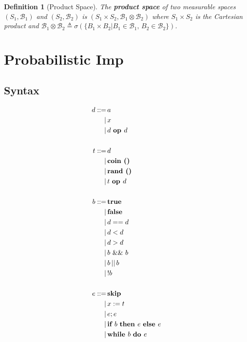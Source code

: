 \documentclass{article}
\newtheorem*{definition}{Definition}
\begin{document}
	\begin{definition}[Product Space]
		The {\bf product space} of two measurable spaces $(S_1, \mathcal{B}_1)$ and $(S_2, \mathcal{B}_2)$ is $(S_1 \times S_2, \mathcal{B}_1 \otimes \mathcal{B}_2)$
		where $S_1 \times S_2$ is the Cartesian product and
		$\mathcal{B}_1 \otimes \mathcal{B}_2 \triangleq \sigma(\{ B_1 \times B_2 | B_1 \in \mathcal{B}_1,\, B_2 \in \mathcal{B}_2\})$.
		
	\end{definition}
	
\section{Probabilistic Imp}
	\subsection{Syntax}
	\begin{equation*}
		\begin{split}
			d ::
			=\,& a \\ 
			|\,& x \\
			|\,& d \text{ \bf op } d \\
			\,\\
			t ::
			=\,& d \\
			|\,& \text{\bf coin () } \\
			|\,& \text{\bf rand () } \\
			|\,& t \text{ \bf op } d \\
			\,\\
			b ::
			=\,& \text{\bf true} \\
			|\,& \text{\bf false} \\
			|\,& d == d \\
			|\,& d < d \\
			|\,& d > d \\
			|\,& b \text{ \&\& } b \\
			|\,& b \,||\, b \\
			|\,& !b \\
			\,\\
			e ::
			=\,& \text{\bf skip} \\
			|\,& x := t \\
			|\,& e; e \\
			|\,& \text{\bf if } b \text{ \bf then } e \text{ \bf else } e \\
			|\,& \text{\bf while } b \text{ \bf do } e \\
		\end{split}
	\end{equation*}
	
\end{document}
